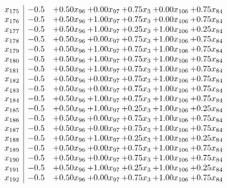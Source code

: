 \documentclass[8pt]{article}
\begin{document}
\[\begin{array}{c| c c@{\hskip 2pt} c@{\hskip 2pt} c@{\hskip 2pt} c@{\hskip 2pt} c@{\hskip 2pt} }
 x_{175}   &  -0.5 & +  0.50 x_{96} & +  0.00 x_{97} & +  0.75 x_{3} & +  0.00 x_{106} & +  0.75 x_{84}\\
 x_{176}   &  -0.5 & +  0.50 x_{96} & +  1.00 x_{97} & +  0.75 x_{3} & +  0.00 x_{106} & +  0.75 x_{84}\\
 x_{177}   &  -0.5 & +  0.50 x_{96} & +  1.00 x_{97} & +  0.25 x_{3} & +  1.00 x_{106} & +  0.25 x_{84}\\
 x_{178}   &  -0.5 & +  0.50 x_{96} & +  0.00 x_{97} & +  0.75 x_{3} & +  1.00 x_{106} & +  0.75 x_{84}\\
 x_{179}   &  -0.5 & +  0.50 x_{96} & +  1.00 x_{97} & +  0.75 x_{3} & +  1.00 x_{106} & +  0.75 x_{84}\\
 x_{180}   &  -0.5 & +  0.50 x_{96} & +  1.00 x_{97} & +  0.75 x_{3} & +  1.00 x_{106} & +  0.75 x_{84}\\
 x_{181}   &  -0.5 & +  0.50 x_{96} & +  1.00 x_{97} & +  0.75 x_{3} & +  1.00 x_{106} & +  0.75 x_{84}\\
 x_{182}   &  -0.5 & +  0.50 x_{96} & +  0.00 x_{97} & +  0.75 x_{3} & +  1.00 x_{106} & +  0.75 x_{84}\\
 x_{183}   &  -0.5 & +  0.50 x_{96} & +  0.00 x_{97} & +  0.75 x_{3} & +  1.00 x_{106} & +  0.75 x_{84}\\
 x_{184}   &  -0.5 & +  0.50 x_{96} & +  1.00 x_{97} & +  0.75 x_{3} & +  1.00 x_{106} & +  0.75 x_{84}\\
 x_{185}   &  -0.5 & +  0.50 x_{96} & +  1.00 x_{97} & +  0.25 x_{3} & +  1.00 x_{106} & +  0.25 x_{84}\\
 x_{186}   &  -0.5 & +  0.50 x_{96} & +  0.00 x_{97} & +  0.75 x_{3} & +  1.00 x_{106} & +  0.75 x_{84}\\
 x_{187}   &  -0.5 & +  0.50 x_{96} & +  0.00 x_{97} & +  0.75 x_{3} & +  1.00 x_{106} & +  0.75 x_{84}\\
 x_{188}   &  -0.5 & +  0.50 x_{96} & +  1.00 x_{97} & +  0.25 x_{3} & +  1.00 x_{106} & +  0.25 x_{84}\\
 x_{189}   &  -0.5 & +  0.50 x_{96} & +  0.00 x_{97} & +  0.75 x_{3} & +  1.00 x_{106} & +  0.75 x_{84}\\
 x_{190}   &  -0.5 & +  0.50 x_{96} & +  0.00 x_{97} & +  0.75 x_{3} & +  1.00 x_{106} & +  0.75 x_{84}\\
 x_{191}   &  -0.5 & +  0.50 x_{96} & +  1.00 x_{97} & +  0.25 x_{3} & +  1.00 x_{106} & +  0.25 x_{84}\\
 x_{192}   &  -0.5 & +  0.50 x_{96} & +  0.00 x_{97} & +  0.75 x_{3} & +  1.00 x_{106} & +  0.75 x_{84}\\

\end{array}\]
\end{document}
